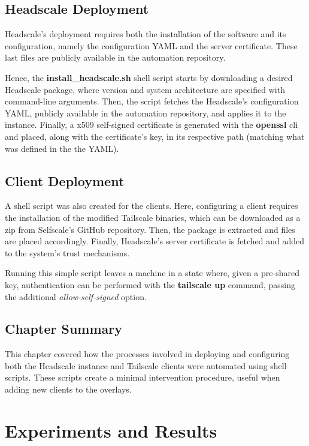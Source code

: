 \documentclass[11pt,twoside,a4paper]{report}
\begin{document}
\section{Headscale Deployment}

Headscale's deployment requires both the installation of the software and its configuration, namely the configuration YAML and the server certificate. These last files are publicly available in the automation repository.

Hence, the \textbf{install\_headscale.sh} shell script starts by downloading a desired Headscale package, where version and system architecture are specified with command-line arguments. Then, the script fetches the Headscale's configuration YAML, publicly available in the automation repository, and applies it to the instance. Finally, a x509 self-signed certificate is generated with the \textbf{openssl} \ac{cli} and placed, along with the certificate's key, in its respective path (matching what was defined in the the YAML).

\section{Client Deployment}

A shell script was also created for the clients. Here, configuring a client requires the installation of the modified Tailscale binaries, which can be downloaded as a zip from Selfscale's GitHub repository. Then, the package is extracted and files are placed accordingly. Finally, Headscale's server certificate is fetched and added to the system's trust mechanisms.

Running this simple script leaves a machine in a state where, given a pre-shared key, authentication can be performed with the \textbf{tailscale up} command, passing the additional \emph{allow-self-signed} option.

\section{Chapter Summary}

This chapter covered how the processes involved in deploying and configuring both the Headscale instance and Tailscale clients were automated using shell scripts. These scripts create a minimal intervention procedure, useful when adding new clients to the overlays.

\chapter{Experiments and Results}
\label{chap:results}
\end{document}
